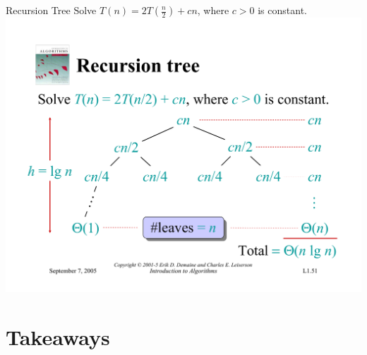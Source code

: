 \documentclass{beamer}
\begin{document}
\begin{frame}{Recursion Tree}
    Solve $T(n) = 2T(\frac{n}{2}) + cn$, where $c > 0$ is constant.\\
    \vspace{5mm}
    \centering
    \includegraphics[width=\textwidth, trim={0.49cm 1.25cm 0.7cm 5.75cm}, clip]{pages/lec1_51}
\end{frame}

%

\section*{Takeaways}
\end{document}
